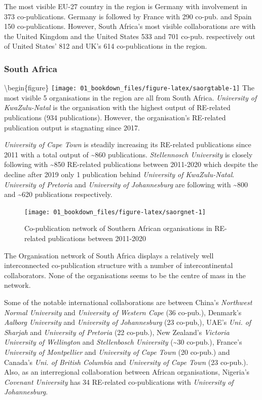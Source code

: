 \documentclass[
]{book}
\begin{document}
The most visible EU-27 country in the region is Germany with involvement in 373 co-publications. Germany is followed by France with 290 co-pub. and Spain 150 co-publications. However, South Africa's most visible collaborations are with the United Kingdom and the United States 533 and 701 co-pub. respectively out of United States' 812 and UK's 614 co-publications in the region.

\hypertarget{south-africa}{%
\subsubsection{South Africa}\label{south-africa}}

\textbackslash begin\{figure\}
\texttt{[image: 01\_bookdown\_files/figure-latex/saorgtable-1]}
The most visible 5 organisations in the region are all from South Africa. \emph{University of KwaZulu-Natal} is the organisation with the highest output of RE-related publications (934 publications). However, the organisation's RE-related publication output is stagnating since 2017.

\emph{University of Cape Town} is steadily increasing its RE-related publications since 2011 with a total output of \textasciitilde860 publications. \emph{Stellennosch University} is closely following with \textasciitilde850 RE-related publications between 2011-2020 which despite the decline after 2019 only 1 publication behind \emph{University of KwaZulu-Natal}. \emph{University of Pretoria} and \emph{University of Johannesburg} are following with \textasciitilde800 and \textasciitilde620 publications respectively.

\begin{figure}
\texttt{[image: 01\_bookdown\_files/figure-latex/saorgnet-1]} \caption{Co-publication network of Southern African organisations in RE-related publications between 2011-2020}\label{fig:saorgnet}
\end{figure}

The Organisation network of South Africa displays a relatively well interconnected co-publication structure with a number of intercontinental collaborators. None of the organisations seems to be the centre of mass in the network.

Some of the notable international collaborations are between China's \emph{Northwest Normal University} and \emph{University of Western Cape} (36 co-pub.), Denmark's \emph{Aalborg University} and \emph{University of Johannesburg} (23 co-pub,), UAE's \emph{Uni. of Sharjah} and \emph{University of Pretoria} (22 co-pub.), New Zealand's \emph{Victoria University of Wellington} and \emph{Stellenbosch University} (\textasciitilde30 co-pub.), France's \emph{University of Montpellier} and \emph{University of Cape Town} (20 co-pub.) and Canada's \emph{Uni. of British Columbia} and \emph{University of Cape Town} (23 co-pub.). Also, as an interregional collaboration between African organisations, Nigeria's \emph{Covenant University} has 34 RE-related co-publications with \emph{University of Johannesburg}.
\end{document}
